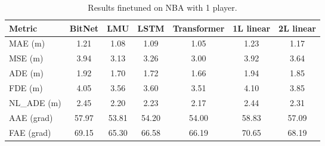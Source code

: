\begin{table}[H]
\centering
\caption{Results finetuned on NBA with 1 player.}
\label{fine:NBA}
\begin{tabular}{l||c|c|c|c|c|c}

Metric & BitNet & LMU & LSTM & Transformer & 1L linear &  2L linear \\
\hline\hline
MAE (m) & 1.21 & 1.08 & 1.09 & 1.05 & 1.23 & 1.17 \\
MSE (m) & 3.94 & 3.13 & 3.26 & 3.00 & 3.92 & 3.64 \\
ADE (m) & 1.92 & 1.70 & 1.72 & 1.66 & 1.94 & 1.85 \\
FDE (m) & 4.05 & 3.56 & 3.60 & 3.51 & 4.10 & 3.85 \\
NL\_ADE (m) & 2.45 & 2.20 & 2.23 & 2.17 & 2.44 & 2.31 \\
AAE (grad) & 57.97 & 53.81 & 54.20 & 54.00 & 58.83 & 57.09 \\
FAE (grad) & 69.15 & 65.30 & 66.58 & 66.19 & 70.65 & 68.19 \\
\end{tabular}
\end{table}
